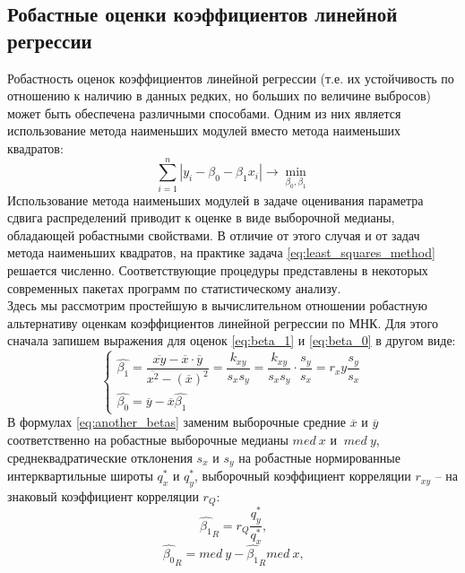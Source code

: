 \documentclass[main.tex]{subfiles}
\begin{document}
\subsection{Робастные оценки коэффициентов линейной регрессии}
Робастность оценок коэффициентов линейной регрессии (т.е. их устойчивость по отношению к наличию в данных редких, но больших по величине выбросов) может быть обеспечена различными способами. Одним из них является использование метода наименьших модулей вместо метода наименьших квадратов:
\begin{equation} \label{least_modules_method}
	\sum_{i=1}^{n} |y_i - \beta_0 - \beta_1 x_i| \rightarrow \min_{\beta_0, \beta_{1}}
\end{equation}
Использование метода наименьших модулей в задаче оценивания параметра сдвига распределений приводит к оценке в виде выборочной медианы, обладающей робастными свойствами. В отличие от этого случая и от задач метода наименьших квадратов, на практике задача \eqref{eq:least_squares_method} решается численно. Соответствующие процедуры представлены в некоторых современных пакетах программ по статистическому анализу. \\
Здесь мы рассмотрим простейшую в вычислительном отношении робастную альтернативу оценкам коэффициентов линейной регрессии по МНК. Для этого сначала запишем выражения для оценок \eqref{eq:beta_1} и \eqref{eq:beta_0} в другом виде:
\begin{equation} \label{eq:another_betas}
	\begin{cases}
		\hat{\beta_1} =
		\dfrac{\overline{x y} - \overline{x} \cdot \overline{y}}{\overline{x^2} - (\overline{x})^2} = 
		\dfrac{k_{x y}}{s_x s_y} = \dfrac{k_{x y}}{s_x s_y} \cdot \dfrac{s_y}{s_x} = r_xy \dfrac{s_y}{s_x} \\
		\hat{\beta_0} = \overline{y} - \overline{x} \hat{\beta_1}
	\end{cases}
\end{equation}
В формулах \eqref{eq:another_betas} заменим выборочные средние $\overline{x}
\text{ и } \overline{y}$ соответственно на робастные выборочные медианы $med \ x
\text{ и } \ med \ y$, среднеквадратические отклонения $s_x \text{ и } s_y$ на робастные нормированные интерквартильные широты $q_{x}^* \text{ и } q_{y}^*$, выборочный коэффициент корреляции $r_{x y}$ -- на знаковый коэффициент корреляции $r_Q$:
\begin{equation}
	\hat{\beta_1}_R = r_Q \dfrac{q_{y}^*}{q_{x}^*} \text{,}
\end{equation}
\begin{equation}
	\hat{\beta_0}_R = med \ y - \hat{\beta_1}_R med \ x \text{,}
\end{equation}
\end{document}
